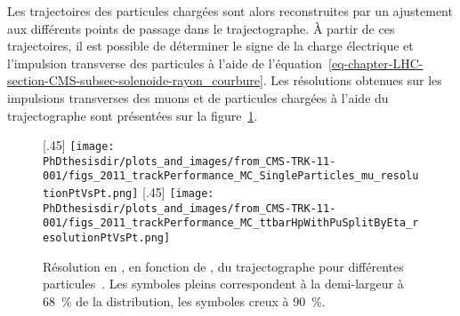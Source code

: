 \par
Les trajectoires des particules chargées sont alors reconstruites par un ajustement aux différents points de passage dans le trajectographe.
À partir de ces trajectoires, il est possible de déterminer le signe de la charge électrique et l'impulsion transverse des particules à l'aide de l'équation~\eqref{eq-chapter-LHC-section-CMS-subsec-solenoide-rayon_courbure}.
Les résolutions obtenues sur les impulsions transverses des muons et de particules chargées à l'aide du trajectographe sont présentées sur la figure~\ref{fig-chapter-LHC-section-CMS-subsec-tracker-pT-resolution}.
\begin{figure}[h]
\centering
{}[.45\textwidth]
{\texttt{[image: \\PhDthesisdir/plots\_and\_images/from\_CMS-TRK-11-001/figs\_2011\_trackPerformance\_MC\_SingleParticles\_mu\_resolutionPtVsPt.png]}}
\hfill
{}[.45\textwidth]
{\texttt{[image: \\PhDthesisdir/plots\_and\_images/from\_CMS-TRK-11-001/figs\_2011\_trackPerformance\_MC\_ttbarHpWithPuSplitByEta\_resolutionPtVsPt.png]}}
\caption[Résolution en \pT\ du trajectographe.]{Résolution en \pT, en fonction de \pT, du trajectographe pour différentes particules~\cite{CMS-TRK-11-001}. Les symboles pleins correspondent à la demi-largeur à \SI{68}{\%} de la distribution, les symboles creux à \SI{90}{\%}.}
\label{fig-chapter-LHC-section-CMS-subsec-tracker-pT-resolution}
\end{figure}
